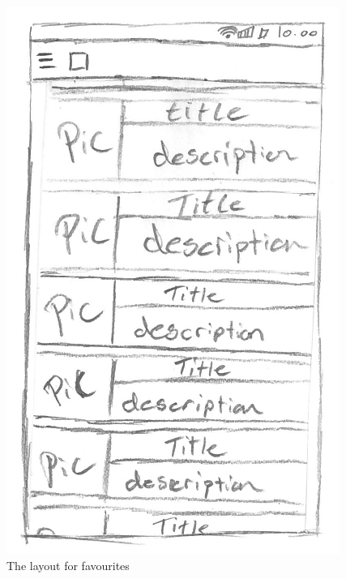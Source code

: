 \begin{figure}[H]
\begin{minipage}[b]{0.5\columnwidth}
\centering
\includegraphics[width=0.7\columnwidth]{../img/prototypes/favorites.pdf}
\caption{The layout for favourites\label{fig:favourite}}
\end{minipage}
\hspace{0.5cm}
\begin{minipage}[b]{0.5\columnwidth}
\centering

\end{minipage}
\end{figure}
